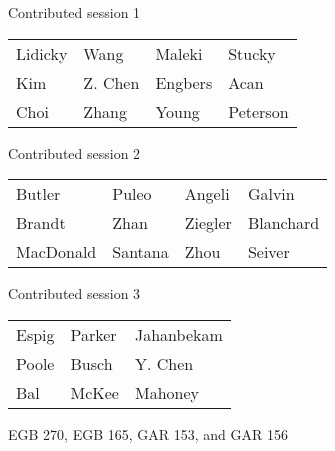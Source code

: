 \documentclass{article}
\begin{document}
\vspace{.5in}

Contributed session 1\\
\begin{tabular}{|l|l|l|l| }
\hline
  Lidicky & Wang & Maleki & Stucky  \\
  Kim & Z. Chen & Engbers & Acan  \\
  Choi & Zhang & Young & Peterson  \\
\hline
\end{tabular}

Contributed session 2\\
\begin{tabular}{|l|l|l|l| }
\hline
  Butler & Puleo & Angeli & Galvin \\
  Brandt & Zhan & Ziegler & Blanchard \\
  MacDonald & Santana & Zhou & Seiver \\
\hline
\end{tabular}

Contributed session 3\\
\begin{tabular}{|l|l|l| }
\hline
  Espig & Parker & Jahanbekam  \\
  Poole & Busch & Y. Chen \\
  Bal & McKee & Mahoney \\
\hline
\end{tabular}

EGB 270, EGB 165, GAR 153, and GAR 156

\newpage





\end{document}
